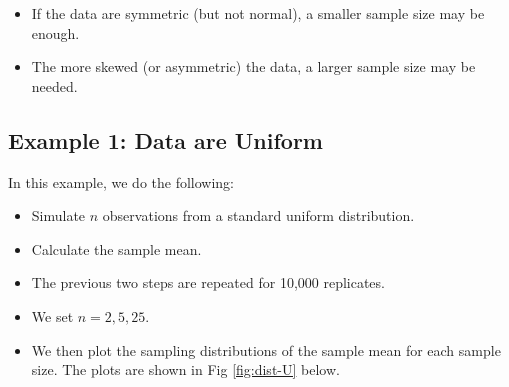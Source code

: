 \documentclass[
]{book}
\providecommand{\tightlist}{%
  \setlength{\itemsep}{0pt}\setlength{\parskip}{0pt}}
\theoremstyle{definition}
\theoremstyle{definition}
\theoremstyle{definition}
\theoremstyle{definition}
\theoremstyle{remark}
\begin{document}
\begin{itemize}
\tightlist
\item
  If the data are symmetric (but not normal), a smaller sample size may be enough.
\item
  The more skewed (or asymmetric) the data, a larger sample size may be needed.
\end{itemize}

\hypertarget{example-1-data-are-uniform}{%
\subsection{Example 1: Data are Uniform}\label{example-1-data-are-uniform}}

In this example, we do the following:

\begin{itemize}
\tightlist
\item
  Simulate \(n\) observations from a standard uniform distribution.
\item
  Calculate the sample mean.
\item
  The previous two steps are repeated for 10,000 replicates.
\item
  We set \(n = 2, 5, 25\).
\item
  We then plot the sampling distributions of the sample mean for each sample size. The plots are shown in Fig \ref{fig:dist-U} below.
\end{itemize}
\end{document}
